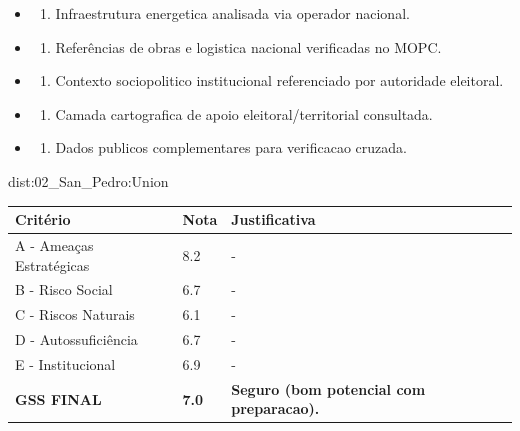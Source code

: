 {\begin{itemize}
\item
  \begin{enumerate}
  \def\labelenumi{\arabic{enumi})}
  \setcounter{enumi}{7}
  \tightlist
  \item
    Infraestrutura energetica analisada via operador nacional.
  \end{enumerate}
\item
  \begin{enumerate}
  \def\labelenumi{\arabic{enumi})}
  \setcounter{enumi}{8}
  \tightlist
  \item
    Referências de obras e logistica nacional verificadas no MOPC.
  \end{enumerate}
\item
  \begin{enumerate}
  \def\labelenumi{\arabic{enumi})}
  \setcounter{enumi}{9}
  \tightlist
  \item
    Contexto sociopolitico institucional referenciado por autoridade
    eleitoral.
  \end{enumerate}
\item
  \begin{enumerate}
  \def\labelenumi{\arabic{enumi})}
  \setcounter{enumi}{10}
  \tightlist
  \item
    Camada cartografica de apoio eleitoral/\allowbreak territorial consultada.
  \end{enumerate}
\item
  \begin{enumerate}
  \def\labelenumi{\arabic{enumi})}
  \setcounter{enumi}{11}
  \tightlist
  \item
    Dados publicos complementares para verificacao cruzada.
  \end{enumerate}
\end{itemize}}{dist:02_San_Pedro:Union}
\begin{table}[ht!]
\small \begin{tabular}{p{3.0cm}p{0.8cm}p{6.0cm}} \toprule
\textbf{Critério} & \textbf{Nota} & \textbf{Justificativa} \\ \midrule
A - Ameaças Estratégicas & 8.2 & - \\
B - Risco Social & 6.7 & - \\
C - Riscos Naturais & 6.1 & - \\
D - Autossuficiência & 6.7 & - \\
E - Institucional & 6.9 & - \\
\midrule \textbf{GSS FINAL} & \textbf{7.0} & \textbf{Seguro (bom potencial com preparacao).} \\ \bottomrule \end{tabular}
\end{table}
